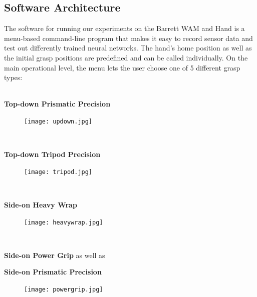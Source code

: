 \subsection*{Software Architecture}
\label{softarch}
The software for running our experiments on the Barrett WAM and Hand is a menu-based command-line program that makes it easy to record sensor data and test out differently trained neural networks. The hand's home position as well as the initial grasp positions are predefined and can be called individually. On the main operational level, the menu lets the user choose one of 5 different grasp types: \\ \\
\begin{minipage}{0.5\textwidth}
\qquad\quad  \textbf{Top-down Prismatic Precision} 
\begin{figure}[H]
	\centering
	\texttt{[image: updown.jpg]}	
\end{figure}
\end{minipage}
\\[0.5cm]
\begin{minipage}{0.5\textwidth}
\qquad\quad \textbf{Top-down Tripod Precision} 
\begin{figure}[H]
	\centering
	\texttt{[image: tripod.jpg]}	
\end{figure}
\end{minipage} 
\\[0.5cm]
\begin{minipage}{0.5\textwidth}
\qquad\quad \textbf{Side-on Heavy Wrap} 
\begin{figure}[H]
	\centering
	\texttt{[image: heavywrap.jpg]}	
\end{figure}
\end{minipage} 
\\[0.5cm]
\begin{minipage}{0.5\textwidth}
\qquad\quad \textbf{Side-on Power Grip} \quad as well as 

\qquad\quad \textbf{Side-on Prismatic Precision} 
\begin{figure}[H]
	\centering
	\texttt{[image: powergrip.jpg]}	
\end{figure}
\end{minipage}
\\[0.5cm]

